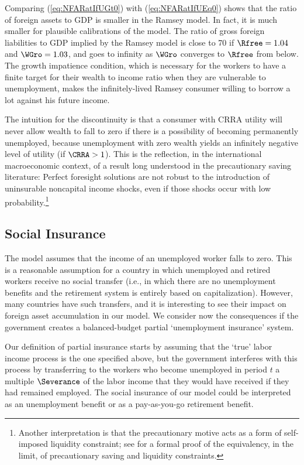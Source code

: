 \documentclass[titlepage]{\econtex}\newcommand{\texname}{cjSOE}
\begin{document}
Comparing (\ref{eq:NFARatIfUGt0}) with (\ref{eq:NFARatIfUEq0}) shows that the ratio of foreign assets to GDP is smaller in the Ramsey model. In fact, it is much smaller for plausible calibrations of the model. The ratio of gross foreign liabilities to GDP implied by the Ramsey model is close to 70 if $\Rfree =1.04$ and $\WGro =1.03$, and goes to infinity as $\WGro$ converges to $\Rfree$ from below. The growth impatience condition, which is necessary for the workers to have a finite target for their wealth to income ratio when they are vulnerable to unemployment, makes the infinitely-lived Ramsey consumer willing to borrow a lot against his future income.

The intuition for the discontinuity is that a consumer with CRRA
utility will never allow wealth to fall to zero if there is a
possibility of becoming permanently unemployed, because unemployment
with zero wealth yields an infinitely negative level of utility (if
$\CRRA>1$).  This is the reflection, in the international
macroeconomic context, of a result long understood in the
precautionary saving literature: Perfect foresight solutions are not
robust to the introduction of uninsurable noncapital income
shocks, even if those shocks occur with low probability.\footnote{Another interpretation is that the precautionary motive acts as a form of self-imposed liquidity constraint; see \cite{BufferStockTheory} for a formal proof of the equivalency, in the limit, of precautionary saving and liquidity constraints.}

\subsection{Social Insurance}

The model assumes that the income of an unemployed worker falls to
zero. This is a reasonable assumption for a country in which
unemployed and retired workers receive no social transfer (i.e., in
which there are no unemployment benefits and the retirement system is
entirely based on capitalization). However, many countries have such
transfers, and it is interesting to see their impact on foreign asset
accumulation in our model. We consider now the consequences if the
government creates a balanced-budget partial `unemployment insurance'
system.

Our definition of partial insurance starts by assuming that the `true'
labor income process is the one specified above, but the government
interferes with this process by transferring to the workers who become unemployed in period $t$ a multiple $\Severance$ of the labor income that they would have received if they had remained employed. The social insurance of our model could be interpreted as an unemployment benefit or as a pay-as-you-go retirement benefit.
\end{document}
